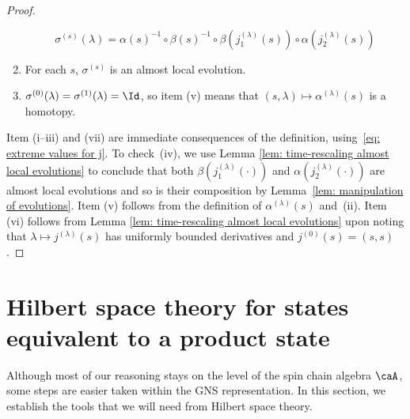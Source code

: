 \begin{proof}
\begin{enumerate}
		$$
		\sigma^{(s)}(\lambda)=\alpha(s )^{-1} \circ  \beta(s )^{-1}  \circ \beta(j_1^{(\lambda)}(s) ) \circ \alpha(j_2^{(\lambda)}(s) )    
		$$
		\item For each $s$,  $\sigma^{(s)}$ is an almost local evolution. 
		\item   $\sigma^{(0)}(\lambda)=\sigma^{(1)}(\lambda)=\Id $, so item (v) means that $(s,\lambda)\mapsto \alpha^{(\lambda)}(s)$ is a homotopy.
	\end{enumerate}
	Item (i--iii) and (vii) are immediate consequences of the definition, using~\eqref{eq: extreme values for j}.  To check~(iv), 
	we use Lemma \ref{lem: time-rescaling almost local evolutions} to conclude that both $\beta(j_1^{(\lambda)}(\cdot) )$ and $ \alpha(j_2^{(\lambda)}(\cdot) ) $ are almost local evolutions and so is their composition by Lemma~\ref{lem: manipulation of evolutions}.  
	Item (v) follows from the definition of $\alpha^{(\lambda)}(s)$ and~(ii).
	Item (vi) follows from Lemma  \ref{lem: time-rescaling almost local evolutions} upon noting that $\lambda \mapsto j^{(\lambda)}(s)$ has uniformly bounded derivatives and $j^{(0)}(s)=(s,s)$.
\end{proof}


\section{Hilbert space theory for states equivalent to a product state} \label{sec: hilbert space theory}

Although most of our reasoning stays on the level of the spin chain algebra $\caA$, some steps are easier taken within the GNS representation. In this section, we establish the tools that we will need from Hilbert space theory.



